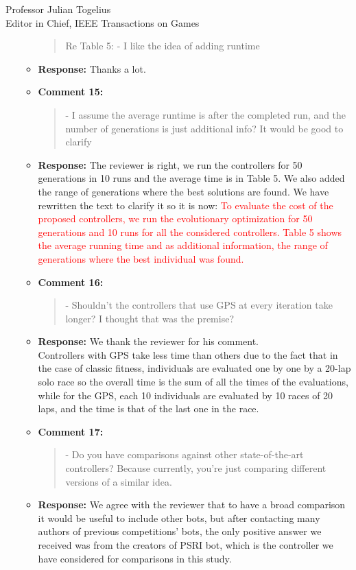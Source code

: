 \documentclass[10pt]{letter} %
\begin{document}
\begin{letter}{Professor Julian Togelius \\ Editor in Chief, IEEE Transactions on Games}
\begin{enumerate}
\begin{itemize}
				\begin{quote}	
					Re Table 5:
					- I like the idea of adding runtime
				\end{quote}	
			\item {\bf Response:} 
						Thanks a lot.
			\item {\bf Comment 15:}
				\begin{quote}	
					- I assume the average runtime is after the completed run, and the number of generations is just additional info? It would be good to clarify
				\end{quote}	
			\item {\bf Response:} 
					The reviewer is right, we run the  controllers for 50 generations in 10 runs and the average time is in Table 5. We also added the range of generations where the best solutions are found.
					We have rewritten the text to clarify it so it is now:
						\textcolor{red}{
						To evaluate the cost of the proposed controllers, we run
						the evolutionary optimization for 50 generations and 10
						runs for all the considered controllers. Table 5 shows the
						average running time and as additional information, the
						range of generations where the best individual was found. } 
			\item {\bf Comment 16:}
				\begin{quote}	
				- Shouldn't the controllers that use GPS at every iteration take longer? I thought that was the premise?
				\end{quote}	
			\item {\bf Response:} 
				We thank the reviewer for his comment. \\
				Controllers with GPS take less time than others due to the fact that in the case of classic fitness, individuals are evaluated one by one by a 20-lap solo race so the overall time is the sum of all the times of the evaluations, while for the GPS, each 10 individuals are evaluated by 10 races of 20 laps, and the time is that of the last one in the race.
			\item {\bf Comment 17:}
				\begin{quote}	
					- Do you have comparisons against other state-of-the-art controllers? Because currently, you're just comparing different versions of a similar idea.
				\end{quote}	

			\item {\bf Response:} 
		We agree with the reviewer that to have a broad comparison it would be useful to include other bots, but after contacting many authors of previous competitions' bots, the only positive answer we received was from the creators of PSRI bot, which is the controller we have considered for comparisons in this study.
			

\end{itemize}
\end{enumerate}
\end{letter}
\end{document}
